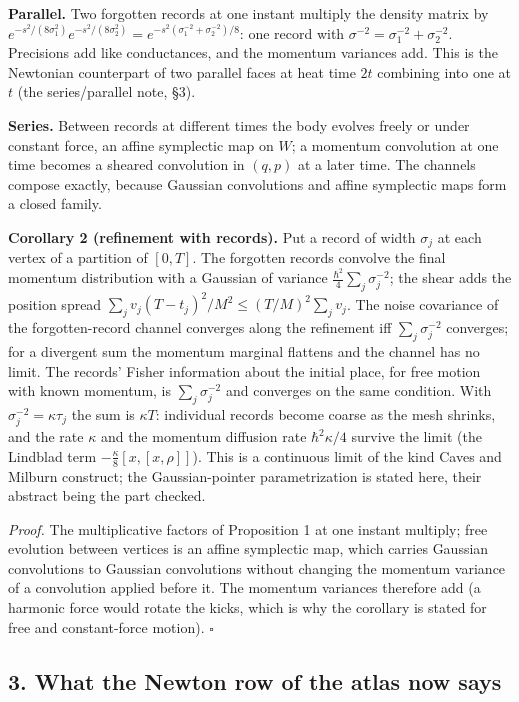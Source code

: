 \documentclass[11pt,a4paper]{article}
\begin{document}
\textbf{Parallel.} Two forgotten records at one instant multiply the
density matrix by
\(e^{-s^2/(8\sigma_1^2)}e^{-s^2/(8\sigma_2^2)}=e^{-s^2(\sigma_1^{-2}+\sigma_2^{-2})/8}\):
one record with \(\sigma^{-2}=\sigma_1^{-2}+\sigma_2^{-2}\). Precisions
add like conductances, and the momentum variances add. This is the
Newtonian counterpart of two parallel faces at heat time \(2t\)
combining into one at \(t\) (the series/parallel note, §3).

\textbf{Series.} Between records at different times the body evolves
freely or under constant force, an affine symplectic map on \(W\); a
momentum convolution at one time becomes a sheared convolution in
\((q,p)\) at a later time. The channels compose exactly, because
Gaussian convolutions and affine symplectic maps form a closed family.

\textbf{Corollary 2 (refinement with records).} Put a record of width
\(\sigma_j\) at each vertex of a partition of \([0,T]\). The forgotten
records convolve the final momentum distribution with a Gaussian of
variance \(\frac{\hbar^2}4\sum_j\sigma_j^{-2}\); the shear adds the
position spread \(\sum_jv_j(T-t_j)^2/M^2\le(T/M)^2\sum_jv_j\). The noise
covariance of the forgotten-record channel converges along the
refinement iff \(\sum_j\sigma_j^{-2}\) converges; for a divergent sum
the momentum marginal flattens and the channel has no limit. The
records' Fisher information about the initial place, for free motion
with known momentum, is \(\sum_j\sigma_j^{-2}\) and converges on the
same condition. With \(\sigma_j^{-2}=\kappa\tau_j\) the sum is
\(\kappa T\): individual records become coarse as the mesh shrinks, and
the rate \(\kappa\) and the momentum diffusion rate \(\hbar^2\kappa/4\)
survive the limit (the Lindblad term \(-\frac\kappa8[x,[x,\rho]]\)).
This is a continuous limit of the kind Caves and Milburn construct; the
Gaussian-pointer parametrization is stated here, their abstract being
the part checked.

\emph{Proof.} The multiplicative factors of Proposition 1 at one instant
multiply; free evolution between vertices is an affine symplectic map,
which carries Gaussian convolutions to Gaussian convolutions without
changing the momentum variance of a convolution applied before it. The
momentum variances therefore add (a harmonic force would rotate the
kicks, which is why the corollary is stated for free and constant-force
motion). \(\square\)

\hypertarget{what-the-newton-row-of-the-atlas-now-says}{%
\subsection{3. What the Newton row of the atlas now
says}\label{what-the-newton-row-of-the-atlas-now-says}}
\end{document}
